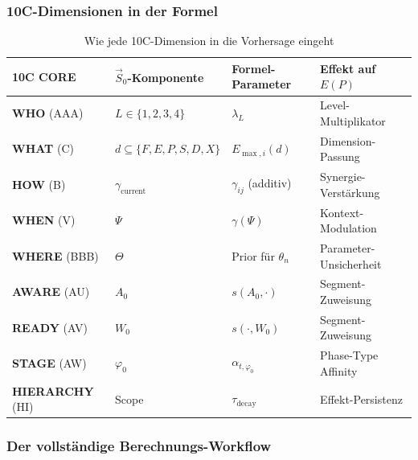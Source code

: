 \subsubsection{10C-Dimensionen in der Formel}

\begin{table}[htbp]
\centering
\caption{Wie jede 10C-Dimension in die Vorhersage eingeht}
\label{tab:20-9c-to-prediction}
\renewcommand{\arraystretch}{1.4}
\footnotesize
\begin{tabular}{@{}llll@{}}
\toprule
\textbf{10C CORE} & \textbf{$\vec{S}_0$-Komponente} & \textbf{Formel-Parameter} & \textbf{Effekt auf $E(P)$} \\
\midrule
\textbf{WHO} (AAA) & $L \in \{1,2,3,4\}$ & $\lambda_L$ & Level-Multiplikator \\
\textbf{WHAT} (C) & $d \subseteq \{F,E,P,S,D,X\}$ & $E_{\max,i}(d)$ & Dimension-Passung \\
\textbf{HOW} (B) & $\gamma_{\text{current}}$ & $\gamma_{ij}$ (additiv) & Synergie-Verstärkung \\
\textbf{WHEN} (V) & $\Psi$ & $\gamma(\Psi)$ & Kontext-Modulation \\
\textbf{WHERE} (BBB) & $\Theta$ & Prior für $\theta_n$ & Parameter-Unsicherheit \\
\textbf{AWARE} (AU) & $A_0$ & $s(A_0, \cdot)$ & Segment-Zuweisung \\
\textbf{READY} (AV) & $W_0$ & $s(\cdot, W_0)$ & Segment-Zuweisung \\
\textbf{STAGE} (AW) & $\varphi_0$ & $\alpha_{t,\varphi_0}$ & Phase-Type Affinity \\
\textbf{HIERARCHY} (HI) & Scope & $\tau_{\text{decay}}$ & Effekt-Persistenz \\
\bottomrule
\end{tabular}
\end{table}

\subsubsection{Der vollständige Berechnungs-Workflow}

